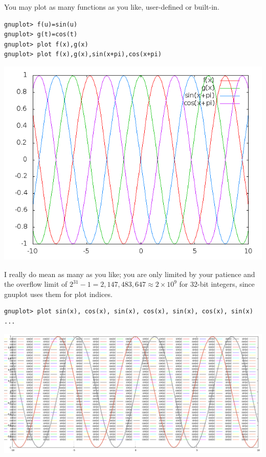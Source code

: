 \documentclass[11pt,letterpaper]{report}
\begin{document}
You may plot as many functions as you like, user-defined or built-in.
\begin{verbatim}
gnuplot> f(u)=sin(u)
gnuplot> g(t)=cos(t)
gnuplot> plot f(x),g(x)
gnuplot> plot f(x),g(x),sin(x+pi),cos(x+pi)
\end{verbatim}
\includegraphics[width=150mm]{multi-plots.png}

I really do mean as many as you like; you are only limited by your patience and the overflow limit of $2^{31}-1 = 2,147,483,647 \approx 2 \times 10^9$ for 32-bit integers, since gnuplot uses them for plot indices.


\begin{verbatim}
gnuplot> plot sin(x), cos(x), sin(x), cos(x), sin(x), cos(x), sin(x) ...
\end{verbatim}

\includegraphics[width=150mm]{too-many-plots.png}
\end{document}
